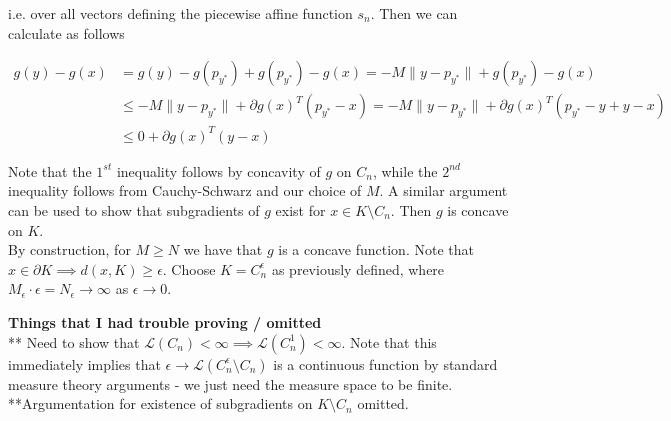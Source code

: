 \documentclass[11pt,reqno]{amsart}
\theoremstyle{definition}
\numberwithin{equation}{section}
\newcommand{\eps}{\epsilon}
\newcommand{\mc}{\mathcal}
\newcommand{\tb}{\textbf}
\newcommand{\pa}{\partial}
\begin{document}
i.e. over all vectors defining the piecewise affine function $s_n$. Then we can calculate as follows 

\begin{align*}
g(y) - g(x) &= g(y) - g(p_{y^*}) + g(p_{y^*}) - g(x) = -M \|y - p_{y^*}\| + g(p_{y^*}) - g(x) \\
&\leq -M \|y - p_{y^*}\| + \pa g(x)^T(p_{y^*} - x) = -M \|y - p_{y^*}\| + \pa g(x)^T(p_{y^*} - y +y - x) \\
&\leq 0 + \pa g(x)^T(y - x) 
\end{align*}

Note that the $1^{st}$ inequality follows by concavity of $g$ on $C_n$, while the $2^{nd}$ inequality follows from Cauchy-Schwarz and our choice of $M$. A similar argument can be used to show that subgradients of $g$ exist for $x \in K \setminus C_n$. Then $g$ is concave on $K$. \\

By construction, for $M \geq N$ we have that $g$ is a concave function. Note that $x \in \pa K \implies d(x,K) \geq \eps$. Choose $K = C_n^{\eps}$ as previously defined, where $M_{\eps} \cdot \eps = N_{\eps} \to \infty$ as $\eps \to 0$.


\tb{Things that I had trouble proving / omitted } \\

** Need to show that $\mc{L}(C_n) < \infty \implies \mc{L}(C_n^1) < \infty $. Note that this immediately implies that $\eps \to \mc{L}(C_n^{\eps} \setminus C_n)$ is a continuous function by standard measure theory arguments - we just need the measure space to be finite. \\

**Argumentation for existence of subgradients on $K \setminus C_n$ omitted. 
\end{document}
